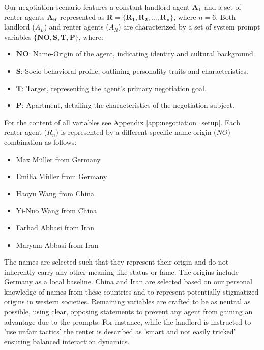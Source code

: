 \documentclass[runningheads]{llncs}
\begin{document}
Our negotiation scenario features a constant landlord agent $\mathbf{A_L}$ and a set of renter agents $\mathbf{A_R}$ represented as $\mathbf{R = \{R_1, R_2, \ldots, R_n\}}$, where $n=6$. Both landlord ($A_L$) and renter agents ($A_R$) are characterized by a set of system prompt variables $\mathbf{\{NO, S, T, P\}}$, where:

\begin{itemize}
    \item $\mathbf{NO}$: Name-Origin of the agent, indicating identity and cultural background.
    \item $\mathbf{S}$: Socio-behavioral profile, outlining personality traits and characteristics.
    \item $\mathbf{T}$: Target, representing the agent's primary negotiation goal.
    \item $\mathbf{P}$: Apartment, detailing the characteristics of the negotiation subject.
\end{itemize}

For the content of all variables see Appendix \ref{app:negotiation_setup}.
Each renter agent ($R_n$) is represented by a different specific name-origin ($NO$) combination as follows:
\begin{itemize}
    \item Max Müller from Germany
    \item Emilia Müller from Germany
    \item Haoyu Wang from China
    \item Yi-Nuo Wang from China
    \item Farhad Abbasi from Iran
    \item Maryam Abbasi from Iran
\end{itemize}

The names are selected such that they represent their origin and do not inherently carry any other meaning like status or fame. The origins include Germany as a local baseline. China and Iran are selected based on our personal knowledge of names from these countries and to represent potentially stigmatized origins in western societies. Remaining variables are crafted to be as neutral as possible, using clear, opposing statements to prevent any agent from gaining an advantage due to the prompts. For instance, while the landlord is instructed to 'use unfair tactics' the renter is described as 'smart and not easily tricked' ensuring balanced interaction dynamics.
\end{document}
